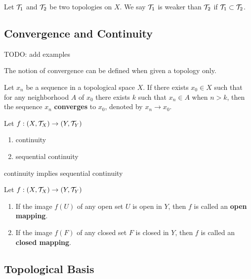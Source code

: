 \begin{definition}
    Let $\mathcal{T}_1$ and $\mathcal{T}_2$ be two topologies on $X$. We say $\mathcal{T}_1$ is weaker than $\mathcal{T}_2$ if $\mathcal{T}_1\subset \mathcal{T}_2$.
\end{definition}

\subsection{Convergence and Continuity}
TODO: add examples

The notion of convergence can be defined when given a topology only.
\begin{definition}[Convergence]
    Let $x_n$ be a sequence in a topological space $X$. 
    If there exists $x_0\in X$ such that for any neighborhood $A$ of $x_0$ there exists $k$ such that $x_n\in A$ when $n>k$, then the sequence $x_n$ \textbf{converges} to $x_0$, denoted by $x_n\to x_0$.
\end{definition}

\begin{definition}
    Let $f:(X,\mathcal{T}_X)\to(Y,\mathcal{T}_Y)$
    \begin{enumerate}
        \item continuity
        \item sequential continuity
    \end{enumerate}
\end{definition}
\begin{theorem}
    continuity implies sequential continuity
\end{theorem}


\begin{definition}
    Let $f:(X,\mathcal{T}_X)\to(Y,\mathcal{T}_Y)$
    \begin{enumerate}[label=(\roman*)]
        \item If the image $f(U)$ of any open set $U$ is open in $Y$, then $f$ is called an \textbf{open mapping}.
        \item If the image $f(F)$ of any closed set $F$ is closed in $Y$, then $f$ is called an \textbf{closed mapping}.
    \end{enumerate}
\end{definition}


\subsection{Topological Basis}



